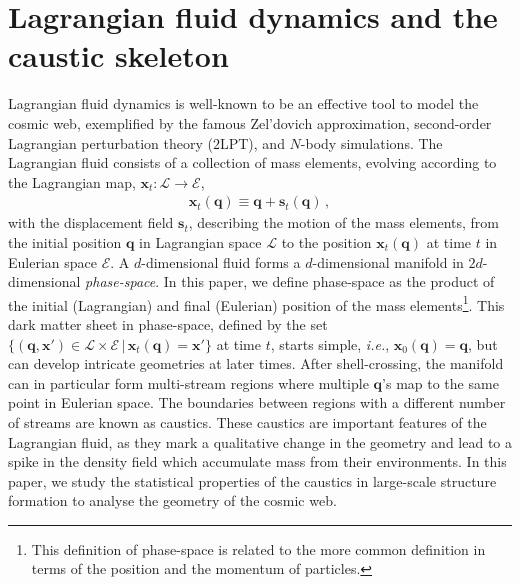 \documentclass[a4paper, 11pt]{article}
\begin{document}
\section{Lagrangian fluid dynamics and the caustic skeleton}
Lagrangian fluid dynamics is well-known to be an effective tool to model the cosmic web, exemplified by the famous Zel'dovich approximation, second-order Lagrangian perturbation theory ($2$LPT), and $N$-body simulations. The Lagrangian fluid consists of a collection of mass elements, evolving according to the Lagrangian map, $\bm{x}_t:\mathcal{L}\to \mathcal{E}$,
\begin{align}
\bm{x}_t(\bm{q}) \equiv \bm{q} + \bm{s}_t(\bm{q})\,,
\end{align}
with the displacement field $\bm{s}_t$, describing the motion of the mass elements, from the initial position $\bm{q}$ in Lagrangian space $\mathcal{L}$ to the position $\bm{x}_t(\bm{q})$ at time $t$ in Eulerian space $\mathcal{E}$. A $d$-dimensional fluid forms a $d$-dimensional manifold in $2d$-dimensional \textit{phase-space}. In this paper, we define phase-space as the product of the initial (Lagrangian) and final (Eulerian) position of the mass elements\footnote{This definition of phase-space is related to the more common definition in terms of the position and the momentum of particles.}. This dark matter sheet in phase-space, defined by the set $\{(\bm{q},\bm{x}') \in \mathcal{L}\times \mathcal{E}\, |\, \bm{x}_t(\bm{q})=\bm{x}'\}$ at time $t$, starts simple, \textit{i.e.}, $\bm{x}_0(\bm{q})=\bm{q}$, but can develop intricate geometries at later times. After shell-crossing, the manifold can in particular form multi-stream regions where multiple $\bm{q}$'s map to the same point in Eulerian space. The boundaries between regions with a different number of streams are known as caustics. These caustics are important features of the Lagrangian fluid, as they mark a qualitative change in the geometry and lead to a spike in the density field which accumulate mass from their environments. In this paper, we study the statistical properties of the caustics in large-scale structure formation to analyse the geometry of the cosmic web.
\end{document}
